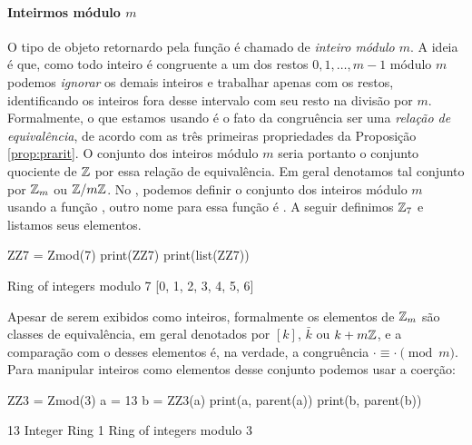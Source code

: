 \paragraph{Inteirmos módulo $m$} 
O tipo de objeto retornardo pela função  é chamado
de \emph{inteiro módulo $m$}. A ideia é que, como todo
inteiro é congruente a um dos restos $0,1,\dots,m-1$ módulo $m$
podemos \emph{ignorar} os demais inteiros e trabalhar apenas
com os restos, identificando os inteiros fora desse intervalo
com seu resto na divisão por $m$. Formalmente, o que estamos
usando é o fato da congruência ser uma
\emph{relação de equivalência}, 
de acordo com as três primeiras propriedades da Proposição
\ref{prop:prarit}. O conjunto dos inteiros módulo $m$ seria
portanto o conjunto quociente de $\mathbb{Z}$ por essa relação
de equivalência. Em geral denotamos tal conjunto por
$\mathbb{Z}_m$ ou $\mathbb{Z}/m\mathbb{Z}$. No \sage, podemos definir
o conjunto dos inteiros módulo $m$ usando a função ,
outro nome para essa função é  .
A seguir definimos $\mathbb{Z}_7$ e listamos seus elementos.
 
\begin{sageinput}
ZZ7 = Zmod(7)
print(ZZ7)
print(list(ZZ7))
\end{sageinput}
\begin{sageoutput}
Ring of integers modulo 7
[0, 1, 2, 3, 4, 5, 6]
\end{sageoutput}
Apesar de serem exibidos como inteiros, formalmente
os elementos de $\mathbb{Z}_m$ são 
classes de equivalência, em geral
denotados por $[k]$, $\bar k$ ou $k + m\mathbb{Z}$,
e a comparação com o \ils{==} desses elementos é,
na verdade, a congruência $\cdot \equiv \cdot \pmod m$.
 Para manipular inteiros como
elementos desse conjunto podemos usar a coerção:
\begin{sageinput}
ZZ3 = Zmod(3)
a = 13
b = ZZ3(a)
print(a, parent(a))
print(b, parent(b))
\end{sageinput}
\begin{sageoutput}
13 Integer Ring
1 Ring of integers modulo 3
\end{sageoutput}

